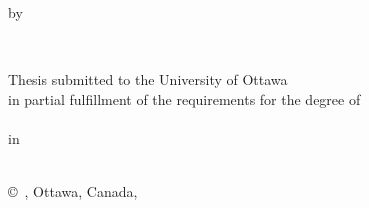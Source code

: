 \begin{titlepage}
        \begin{center}
        \vspace*{1.0cm}

        \Huge
        {\bf \thesistitlecoverpage}
		
        \vspace*{1.0cm}

        \normalsize
        by \\

        \vspace*{1.0cm}

        \Large
        \thesisauthor \\

        \vspace*{3.0cm}

        \normalsize
        Thesis submitted to the University of Ottawa \\ 
        in partial fulfillment of the requirements for the degree of \\
        \thesisdegree \\
        in \\
        \nameofprogram \\
        

        \vspace*{3.0cm}

        \copyright\ {\thesisauthor}, Ottawa, Canada, \graduationyear \\
        \end{center}
\end{titlepage}
